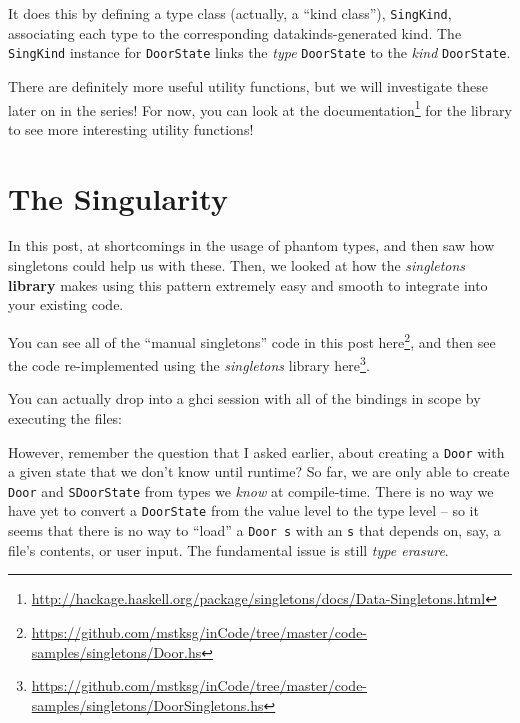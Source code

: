 \documentclass[]{article}
\newenvironment{Shaded}{}{}
\newcommand{\ExtensionTok}[1]{#1}
\newcommand{\NormalTok}[1]{#1}
\renewcommand{\href}[2]{#2\footnote{\url{#1}}}
\begin{document}
It does this by defining a type class (actually, a ``kind class''),
\texttt{SingKind}, associating each type to the corresponding
datakinds-generated kind. The \texttt{SingKind} instance for \texttt{DoorState}
links the \emph{type} \texttt{DoorState} to the \emph{kind} \texttt{DoorState}.

There are definitely more useful utility functions, but we will investigate
these later on in the series! For now, you can look at the
\href{http://hackage.haskell.org/package/singletons/docs/Data-Singletons.html}{documentation}
for the library to see more interesting utility functions!

\hypertarget{the-singularity}{%
\section{The Singularity}\label{the-singularity}}

In this post, at shortcomings in the usage of phantom types, and then saw how
singletons could help us with these. Then, we looked at how the
\emph{singletons} \textbf{library} makes using this pattern extremely easy and
smooth to integrate into your existing code.

You can see all of the ``manual singletons'' code in this post
\href{https://github.com/mstksg/inCode/tree/master/code-samples/singletons/Door.hs}{here},
and then see the code re-implemented using the \emph{singletons} library
\href{https://github.com/mstksg/inCode/tree/master/code-samples/singletons/DoorSingletons.hs}{here}.

You can actually drop into a ghci session with all of the bindings in scope by
executing the files:

\begin{Shaded}
\end{Shaded}

However, remember the question that I asked earlier, about creating a
\texttt{Door} with a given state that we don't know until runtime? So far, we
are only able to create \texttt{Door} and \texttt{SDoorState} from types we
\emph{know} at compile-time. There is no way we have yet to convert a
\texttt{DoorState} from the value level to the type level -- so it seems that
there is no way to ``load'' a \texttt{Door\ s} with an \texttt{s} that depends
on, say, a file's contents, or user input. The fundamental issue is still
\emph{type erasure}.
\end{document}
